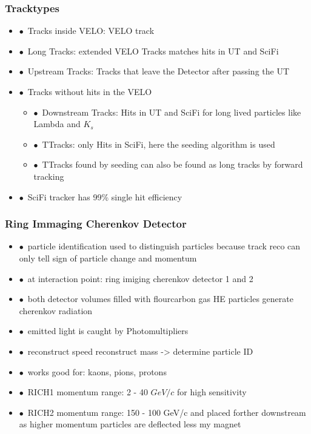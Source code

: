 \documentclass[aspectratio=1610, 12pt, xcolor=dvipsnames]{beamer}
\begin{document}
\begin{frame}\frametitle{Tracktypes}
  \begin{itemize}
    \item $\bullet$\, Tracks inside VELO: VELO track
    \item $\bullet$\, Long Tracks: extended VELO Tracks matches hits in UT and SciFi
    \item $\bullet$\, Upstream Tracks: Tracks that leave the Detector after passing the UT
    \item $\bullet$\, Tracks without hits in the VELO
    \begin{itemize}
      \item $\bullet$\, Downstream Tracks: Hits in UT and SciFi for long lived particles like Lambda and $K_s$
      \item $\bullet$\, TTracks: only Hits in SciFi, here the seeding algorithm is used
      \item $\bullet$\, TTracks found by seeding can also be found as long tracks by forward tracking
    \end{itemize}
    \item $\bullet$\, \to SciFi tracker has 99\% single hit efficiency
  \end{itemize}
\end{frame}

\begin{frame}\frametitle{Ring Immaging Cherenkov Detector}
  \begin{itemize}
    \item $\bullet$\, particle identification used to distinguish particles because track reco can only tell sign of particle change and momentum
    \item $\bullet$\, at interaction point: ring imiging cherenkov detector 1 and 2
    \item $\bullet$\, both detector volumes filled with flourcarbon gas \to HE particles generate cherenkov radiation
    \item $\bullet$\, emitted light is caught by Photomultipliers
    \item $\bullet$\, \to reconstruct speed \to reconstruct mass -> determine particle ID
    \item $\bullet$\, works good for: kaons, pions, protons
    \item $\bullet$\, RICH1 momentum range: 2 - 40 $GeV/c$ for high sensitivity
    \item $\bullet$\, RICH2 momentum range: 150 - 100 GeV/c and placed forther downstream as higher momentum particles are deflected less my magnet
  \end{itemize}
\end{frame}
\end{document}
